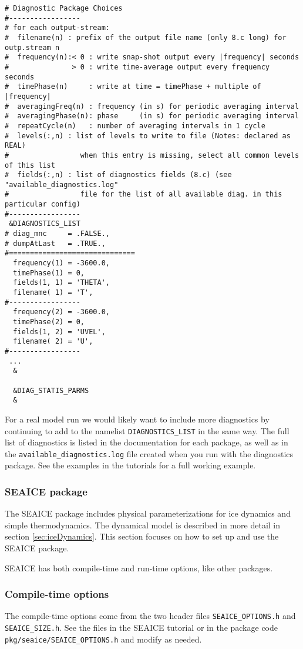 \documentclass[11pt]{article}
\begin{document}
\begin{lstlisting}[caption={Example \texttt{data.diagnostics} file}, captionpos=b]
# Diagnostic Package Choices
#-----------------
# for each output-stream:
#  filename(n) : prefix of the output file name (only 8.c long) for outp.stream n
#  frequency(n):< 0 : write snap-shot output every |frequency| seconds
#               > 0 : write time-average output every frequency seconds
#  timePhase(n)     : write at time = timePhase + multiple of |frequency|
#  averagingFreq(n) : frequency (in s) for periodic averaging interval
#  averagingPhase(n): phase     (in s) for periodic averaging interval
#  repeatCycle(n)   : number of averaging intervals in 1 cycle
#  levels(:,n) : list of levels to write to file (Notes: declared as REAL)
#                 when this entry is missing, select all common levels of this list
#  fields(:,n) : list of diagnostics fields (8.c) (see "available_diagnostics.log"
#                 file for the list of all available diag. in this particular config)
#-----------------
 &DIAGNOSTICS_LIST
# diag_mnc     = .FALSE.,
# dumpAtLast   = .TRUE.,
#==============================
  frequency(1) = -3600.0,
  timePhase(1) = 0,
  fields(1, 1) = 'THETA',
  filename( 1) = 'T',
#-----------------
  frequency(2) = -3600.0,
  timePhase(2) = 0,
  fields(1, 2) = 'UVEL',
  filename( 2) = 'U',
#-----------------
 ...
  &

  &DIAG_STATIS_PARMS
  &
\end{lstlisting}
For a real model run we would likely want to include more diagnostics by continuing to add to the namelist \verb|DIAGNOSTICS_LIST| in the same way. The full list of diagnostics is listed in the documentation for each package, as well as in the \verb|available_diagnostics.log| file created when you run with the diagnostics package. See the examples in the tutorials for a full working example.

\subsubsection{SEAICE package}
\label{sec:SEAICE}
The SEAICE package includes physical parameterizations for ice dynamics and simple thermodynamics. The dynamical model is described in more detail in section \ref{sec:iceDynamics}. This section focuses on how to set up and use the SEAICE package.

SEAICE has both compile-time and run-time options, like other packages.

\subsubsection*{Compile-time options}
The compile-time options come from the two header files \verb|SEAICE_OPTIONS.h| and \verb|SEAICE_SIZE.h|. See the files in the SEAICE tutorial or in the package code \verb|pkg/seaice/SEAICE_OPTIONS.h| and modify as needed.
\end{document}
